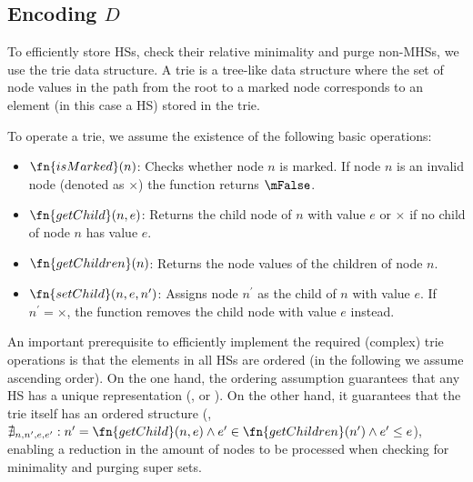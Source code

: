 \subsection{Encoding \texorpdfstring{$D$}{D}}
\label{sec:mhs2o:trie}
To efficiently store \acp{HS}, check their relative minimality and
purge non-\acp{MHS}, we use the trie data structure.
%
A trie is a tree-like data structure where the set of node values in
the path from the root to a marked node corresponds to an element (in
this case a \ac{HS}) stored in the trie.

To operate a trie, we assume the existence of the following basic
operations:
\begin{itemize}
\item $\fn{isMarked}(n)$: Checks whether node $n$ is marked. If node
  $n$ is an invalid node (denoted as $\times$) the function returns
  $\mFalse$.
\item $\fn{getChild}(n,e)$: Returns the child node of $n$ with value
  $e$ or $\times$ if no child of node $n$ has value $e$.
\item $\fn{getChildren}(n)$: Returns the node values of the children
  of node $n$.
\item $\fn{setChild}(n,e,n^\prime)$: Assigns node $n^\prime$ as the
  child of $n$ with value $e$. If $n^\prime = \times$, the function
  removes the child node with value $e$ instead.
\end{itemize}


%
An important prerequisite to efficiently implement the required
(complex) trie operations is that the elements in all \acp{HS} are
ordered (in the following we assume ascending order).
%
On the one hand, the ordering assumption guarantees that any \ac{HS}
has a unique representation (\eg,  \vs{}  or
).
%
On the other hand, it guarantees that the trie itself has an ordered
structure (\ie, $\nexists_{n,n^\prime,e,e^\prime} : n^\prime =
\fn{getChild}(n,e) \wedge e^\prime \in \fn{getChildren}(n^\prime)
\wedge e^\prime \leq e $), enabling a reduction in the amount of nodes
to be processed when checking for minimality and purging super sets.

